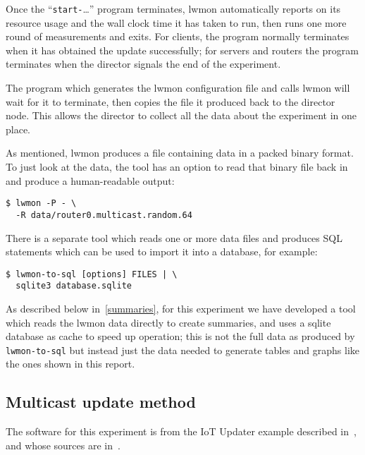 \documentclass[a4paper,11pt,twocolumn]{article}
\begin{document}
Once the ``{\tt start-}\ldots'' program terminates, lwmon automatically
reports on its resource usage and the wall clock time it has taken to run,
then runs one more round of measurements and exits.  For clients, the
program normally terminates when it has obtained the update successfully;
for servers and routers the program terminates when the director signals
the end of the experiment.

The program which generates the lwmon configuration file and calls lwmon
will wait for it to terminate, then copies the file it produced back
to the director node. This allows the director to collect all the
data about the experiment in one place.

As mentioned, lwmon produces a file containing data in a packed binary
format. To just look at the data, the tool has an option to read that
binary file back in and produce a human-readable output:

\begin{small}
\begin{verbatim}
$ lwmon -P - \
  -R data/router0.multicast.random.64
\end{verbatim}
\end{small}

There is a separate tool which reads one or more data files and produces
SQL statements which can be used to import it into a database, for example:

\begin{small}
\begin{verbatim}
$ lwmon-to-sql [options] FILES | \
  sqlite3 database.sqlite
\end{verbatim}
\end{small}

As described below in~\ref{summaries}, for this experiment we have developed
a tool which reads the lwmon data directly to create summaries, and uses a
sqlite database as cache to speed up operation; this is not the full data
as produced by {\tt lwmon-to-sql} but instead just the data needed to
generate tables and graphs like the ones shown in this report.

\subsection{Multicast update method}
\label{iotupd}

The software for this experiment is from the IoT Updater example described
in~\cite{iotupd:presentation}, and whose sources are in~\cite{iotupd:sources}.
\end{document}
